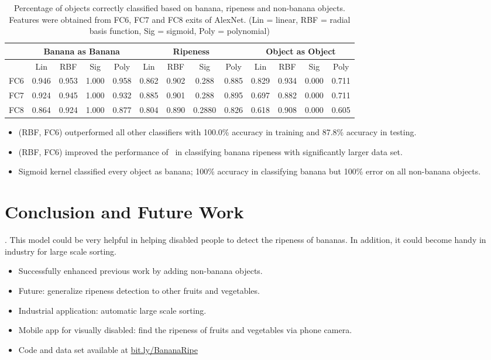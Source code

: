 \documentclass{article} %
\begin{document}
\begin{table}[h]
\centering
\caption{Percentage of objects correctly classified based on banana, ripeness and non-banana objects. Features were obtained from FC6, FC7 and FC8 exits of AlexNet. (Lin = linear, RBF = radial basis function, Sig = sigmoid, Poly = polynomial)}
\label{tab:banana}
\begin{tabular}{|c|c|c|c|c|c|c|c|c|c|c|c|c|}\hline
 &  \multicolumn{4}{c|}{Banana as Banana} & \multicolumn{4}{c|}{Ripeness}& \multicolumn{4}{c|}{Object as Object}\\\hline
&Lin& RBF&Sig&Poly&Lin& RBF&Sig&Poly&Lin& RBF&Sig&Poly\\\hline
FC6&0.946&0.953&1.000&0.958&0.862&0.902&0.288&0.885&0.829&0.934&0.000&0.711\\\hline
FC7&0.924&0.945&1.000&0.932&0.885&0.901&0.288&0.895&0.697&0.882&0.000&0.711\\\hline
FC8&0.864&0.924&1.000&0.877&0.804&0.890&0.2880&0.826&0.618&0.908&0.000&0.605\\\hline
\end{tabular}
\end{table}

\begin{itemize}
\item (RBF, FC6)  outperformed all other classifiers with 100.0\% accuracy in training and 87.8\% accuracy in testing.
\item (RBF, FC6) improved the performance of~\citet{saad2009recognizing} in classifying banana ripeness with significantly larger data set.
\item Sigmoid kernel classified every object as banana; 100\% accuracy in classifying banana but 100\% error on all non-banana objects.
\end{itemize}
\section{Conclusion and Future Work}
\label{sec:conclusion}
. This model could be very helpful in helping disabled people to detect the ripeness of bananas. In addition, it could become handy in industry for large scale sorting. 
\begin{itemize}
\item Successfully enhanced previous work by adding non-banana objects. 
\item Future: generalize ripeness detection to other fruits and vegetables. 
\item Industrial application: automatic large scale sorting. 
\item Mobile app for visually disabled: find the ripeness of fruits and vegetables via phone camera. 
\item Code and data set available at \href{bit.ly/BananaRipe}{bit.ly/BananaRipe}
\end{itemize}
\end{document}
